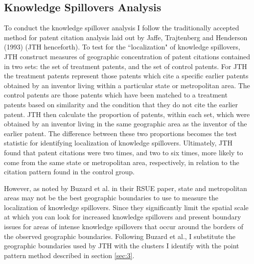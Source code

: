 \documentclass[12pt,letterpaper]{article}
\begin{document}
\subsection{Knowledge Spillovers Analysis}
To conduct the knowledge spillover analysis I follow the traditionally accepted method for patent citation analysis laid out by Jaffe, Trajtenberg and Henderson (1993) (JTH henceforth). To test for the ``localization" of knowledge spillovers, JTH construct measures of geographic concentration of patent citations contained in two sets: the set of treatment patents, and the set of control patents. For JTH the treatment patents represent those patents which cite a specific earlier patents obtained by an inventor living within a particular state or metropolitan area. The control patents are those patents which have been matched to a treatment patents based on similarity and the condition that they do not cite the earlier patent. JTH then calculate the proportion of patents, within each set, which were obtained by an inventor living in the same geographic area as the inventor of the earlier patent. The difference between these two proportions becomes the test statistic for identifying localization of knowledge spillovers. Ultimately, JTH found that patent citations were two times, and two to six times, more likely to come from the same state or metropolitan area, respectively, in relation to the citation pattern found in the control group. 
\par 
However, as noted by Buzard et al. in their RSUE paper, state and metropolitan areas may not be the best geographic boundaries to use to measure the localization of knowledge spillovers. Since they significantly limit the spatial scale at which you can look for increased knowledge spillovers and present boundary issues for areas of intense knowledge spillovers that occur around the borders of the observed geographic boundaries. Following Buzard et al., I substitute the geographic boundaries used by JTH with the clusters I identify with the point pattern method described in section \ref{sec:3}. 
\end{document}
